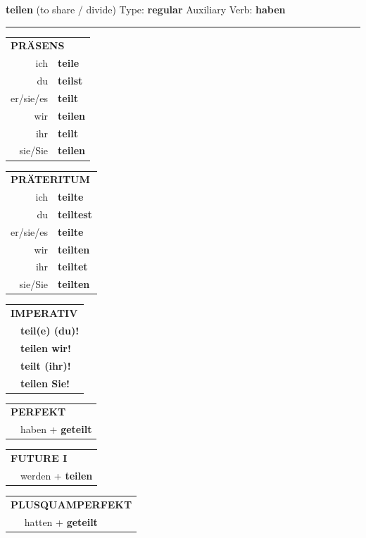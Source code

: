 \documentclass[10pt,a4paper]{revtex4-2}
\begin{document}
\begin{verbbox}
{\Large \bf teilen} (to share / divide) \hfill Type: \textbf{regular} \hfill Auxiliary Verb: \textbf{haben}

\vspace{5pt}
\hrule
\vspace{5pt}

\begin{tabular}{rl}
\multicolumn{2}{l}{\textbf{PRÄSENS}}\\
ich & \textbf{teile}\\
du & \textbf{teilst}\\
er/sie/es & \textbf{teilt}\\
wir & \textbf{teilen}\\
ihr & \textbf{teilt}\\
sie/Sie & \textbf{teilen}\\
\end{tabular}
\hfill
\begin{tabular}{rl}
\multicolumn{2}{l}{\textbf{PRÄTERITUM}}\\
ich & \textbf{teilte}\\
du & \textbf{teiltest}\\
er/sie/es & \textbf{teilte}\\
wir & \textbf{teilten}\\
ihr & \textbf{teiltet}\\
sie/Sie & \textbf{teilten}\\
\end{tabular}
\hfill
\begin{tabular}{rl}
\multicolumn{2}{l}{\textbf{IMPERATIV}}\\
& \textbf{teil(e) (du)!}\\
& \textbf{teilen wir!}\\
& \textbf{teilt (ihr)!}\\
& \textbf{teilen Sie!}\\
\end{tabular}

\vspace{10pt}

\begin{tabular}{rl}
\multicolumn{2}{l}{\textbf{PERFEKT}}\\
& haben + \textbf{geteilt}\\
\end{tabular}
\hfill
\begin{tabular}{rl}
\multicolumn{2}{l}{\textbf{FUTURE I}}\\
& werden + \textbf{teilen}\\
\end{tabular}
\hfill
\begin{tabular}{rl}
\multicolumn{2}{l}{\textbf{PLUSQUAMPERFEKT}}\\
& hatten + \textbf{geteilt}\\
\end{tabular}


\end{verbbox}
\end{document}

